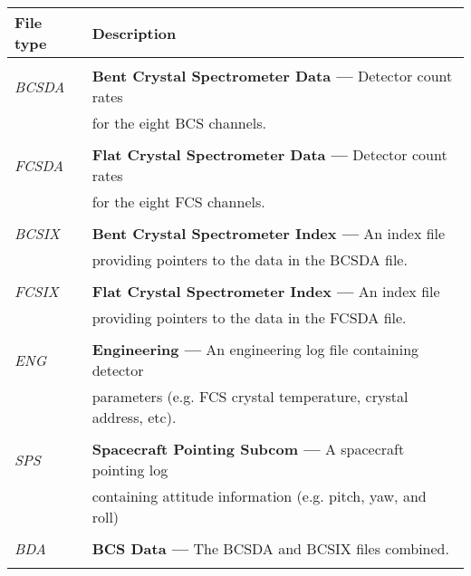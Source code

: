 \begin{center}
\begin{tabular}{||l l||}
\hline
       {\bf File type} & {\bf Description}\\
\hline
                   &            \\                            

 {\em BCSDA} & {\bf Bent Crystal Spectrometer Data ---} Detector count rates \\
                    & for the eight BCS channels. \\
                    &            \\                            
  
 {\em FCSDA} & {\bf Flat Crystal Spectrometer Data ---} Detector count rates \\
                    & for the eight FCS channels. \\
                    &            \\                 

 {\em BCSIX} & {\bf Bent Crystal Spectrometer Index  ---} An index file \\
                   & providing pointers to the data in the BCSDA file.\\
                   &                                \\

 {\em FCSIX} & {\bf Flat Crystal Spectrometer Index ---} An index file  \\
                    & providing pointers to the data in the FCSDA file.\\
                    &  \\                                                     

 {\em ENG} & {\bf Engineering ---} An engineering log file containing detector \\    
     &   parameters (e.g. FCS crystal temperature, crystal address, etc). \\
     &  \\

 {\em SPS} & {\bf Spacecraft Pointing Subcom ---} A spacecraft pointing 
log \\
                  & containing attitude information (e.g. pitch, yaw, and roll) \\
                    &                               \\     

 {\em BDA} & {\bf BCS Data ---} The BCSDA and BCSIX files combined. \\
                   & \\


\end{tabular}
\end{center}
